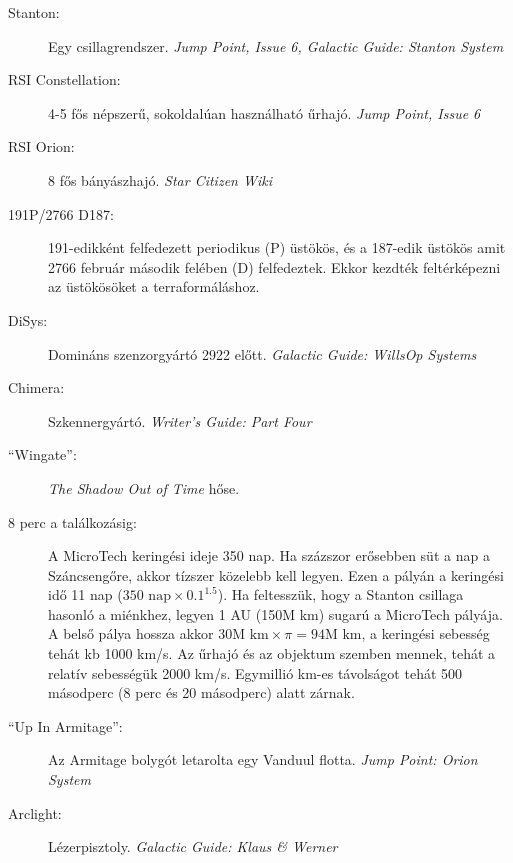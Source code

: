 \documentclass[10pt]{memoir}
\begin{document}
\begin{description}
\item[Stanton:] Egy csillagrendszer. \textit{Jump Point, Issue 6, Galactic
Guide: Stanton System}

\item[RSI Constellation:] 4-5 fős népszerű, sokoldalúan használható űrhajó. \textit{Jump
Point, Issue 6}

\item[RSI Orion:] 8 fős bányászhajó. \textit{Star Citizen Wiki}

\item[191P/2766 D187:] 191-edikként felfedezett periodikus (P) üstökös, és a 187-edik
üstökös amit 2766 február második felében (D) felfedeztek. Ekkor kezdték
feltérképezni az üstökösöket a terraformáláshoz.

\item[DiSys:] Domináns szenzorgyártó 2922 előtt. \textit{Galactic Guide: WillsOp Systems}

\item[Chimera:] Szkennergyártó. \textit{Writer's Guide: Part Four}

\item[``Wingate'':] \textit{The Shadow Out of Time} hőse.

\item[8 perc a találkozásig:] A MicroTech keringési ideje 350 nap. Ha százszor
erősebben süt a nap a Száncsengőre, akkor tízszer közelebb kell legyen. Ezen a
pályán a keringési idő 11 nap ($350 \mbox{ nap} \times 0.1^{1.5}$). Ha feltesszük, hogy a Stanton
csillaga hasonló a miénkhez, legyen 1 AU (150M km) sugarú a MicroTech pályája.
A belső pálya hossza akkor $30 \mbox{M km} \times \pi = 94 \mbox{M km}$, a keringési sebesség tehát kb 1000
km/s. Az űrhajó és az objektum szemben mennek, tehát a relatív sebességük 2000
km/s. Egymillió km-es távolságot tehát 500 másodperc (8 perc és 20 másodperc)
alatt zárnak.

\item[``Up In Armitage'':] Az Armitage bolygót letarolta egy Vanduul flotta. \textit{Jump Point:
Orion System}

\item[Arclight:] Lézerpisztoly. \textit{Galactic Guide: Klaus \& Werner}
\end{description}

\cleartoverso
\cleartorecto
\end{document}
